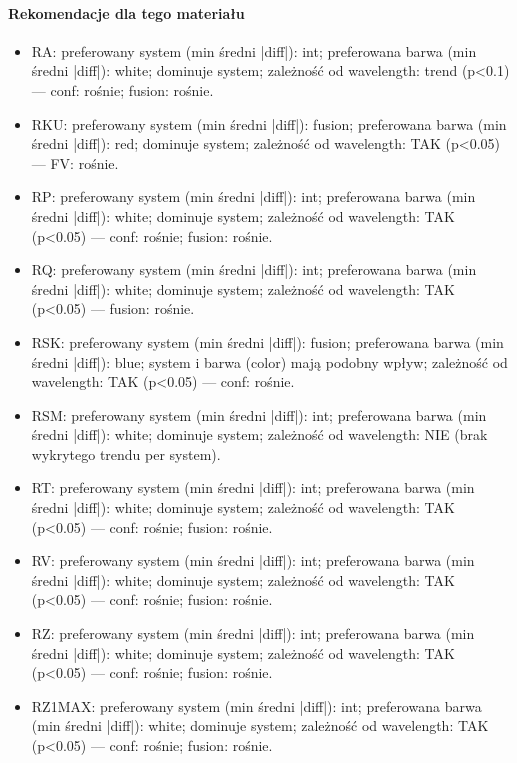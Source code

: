 \documentclass[
  10pt,
]{article}
\begin{document}
\paragraph{Rekomendacje dla tego materiału}
\begin{itemize}
\item RA: preferowany system (min średni |diff|): int; preferowana barwa (min średni |diff|): white; dominuje system; zależność od wavelength: trend (p<0.1) — conf: rośnie; fusion: rośnie.
\item RKU: preferowany system (min średni |diff|): fusion; preferowana barwa (min średni |diff|): red; dominuje system; zależność od wavelength: TAK (p<0.05) — FV: rośnie.
\item RP: preferowany system (min średni |diff|): int; preferowana barwa (min średni |diff|): white; dominuje system; zależność od wavelength: TAK (p<0.05) — conf: rośnie; fusion: rośnie.
\item RQ: preferowany system (min średni |diff|): int; preferowana barwa (min średni |diff|): white; dominuje system; zależność od wavelength: TAK (p<0.05) — fusion: rośnie.
\item RSK: preferowany system (min średni |diff|): fusion; preferowana barwa (min średni |diff|): blue; system i barwa (color) mają podobny wpływ; zależność od wavelength: TAK (p<0.05) — conf: rośnie.
\item RSM: preferowany system (min średni |diff|): int; preferowana barwa (min średni |diff|): white; dominuje system; zależność od wavelength: NIE (brak wykrytego trendu per system).
\item RT: preferowany system (min średni |diff|): int; preferowana barwa (min średni |diff|): white; dominuje system; zależność od wavelength: TAK (p<0.05) — conf: rośnie; fusion: rośnie.
\item RV: preferowany system (min średni |diff|): int; preferowana barwa (min średni |diff|): white; dominuje system; zależność od wavelength: TAK (p<0.05) — conf: rośnie; fusion: rośnie.
\item RZ: preferowany system (min średni |diff|): int; preferowana barwa (min średni |diff|): white; dominuje system; zależność od wavelength: TAK (p<0.05) — conf: rośnie; fusion: rośnie.
\item RZ1MAX: preferowany system (min średni |diff|): int; preferowana barwa (min średni |diff|): white; dominuje system; zależność od wavelength: TAK (p<0.05) — conf: rośnie; fusion: rośnie.
\end{itemize}
\end{document}
